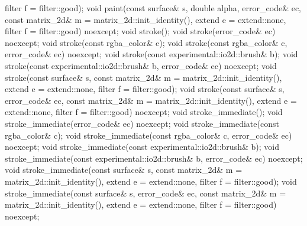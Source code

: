 \begin{codeblock}
{{{{{      filter f = filter::good);
    void paint(const surface& s, double alpha, error_code& ec,
      const matrix_2d& m = matrix_2d::init_identity(), extend e = extend::none, 
      filter f = filter::good)
      noexcept;
    void stroke();
    void stroke(error_code& ec) noexcept;
    void stroke(const rgba_color& c);
    void stroke(const rgba_color& c, error_code& ec) noexcept;
    void stroke(const experimental::io2d::brush& b);
    void stroke(const experimental::io2d::brush& b, error_code& ec) noexcept;
    void stroke(const surface& s,
      const matrix_2d& m = matrix_2d::init_identity(), extend e = extend::none,
      filter f = filter::good);
    void stroke(const surface& s, error_code& ec,
      const matrix_2d& m = matrix_2d::init_identity(), extend e = extend::none, 
      filter f = filter::good) noexcept;
    void stroke_immediate();
    void stroke_immediate(error_code& ec) noexcept;
    void stroke_immediate(const rgba_color& c);
    void stroke_immediate(const rgba_color& c, error_code& ec) noexcept;
    void stroke_immediate(const experimental::io2d::brush& b);
    void stroke_immediate(const experimental::io2d::brush& b, error_code& ec)
      noexcept;
    void stroke_immediate(const surface& s,
      const matrix_2d& m = matrix_2d::init_identity(), extend e = extend::none, 
      filter f = filter::good);
    void stroke_immediate(const surface& s, error_code& ec,
      const matrix_2d& m = matrix_2d::init_identity(), extend e = extend::none, 
      filter f = filter::good) noexcept;
    
}}}}}
\end{codeblock}
